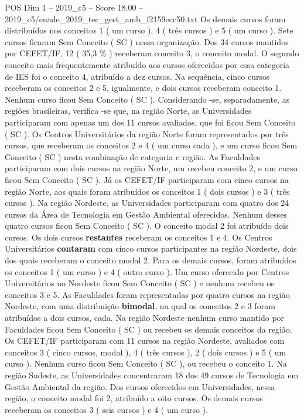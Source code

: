 \begin{textsample}{POS Dim 1 – 2019\_c5 – Score 18.00 – 2019\_c5/enade\_2019\_tec\_gest\_amb\_f2159ecc50.txt}
Os demais cursos foram distribuídos nos conceitos 1 ( um curso ), 4 ( três cursos ) e 5 ( um curso ).
Sete cursos ficaram Sem Conceito ( SC ) nessa organização.
Dos 34 cursos mantidos por CEFET/IF, 12 ( 35,3 \% ) receberam conceito 3, o conceito modal.
O segundo conceito mais frequentemente atribuído aos cursos oferecidos por essa categoria de IES foi o conceito 4, atribuído a dez cursos.
Na sequência, cinco cursos receberam os conceitos 2 e 5, igualmente, e dois cursos receberam conceito 1.
Nenhum curso ficou Sem Conceito ( SC ).
Considerando -se, separadamente, as regiões brasileiras, verifica -se que, na região Norte, as Universidades participaram com apenas um dos 11 cursos avaliados, que foi ficou Sem Conceito ( SC ).
Os Centros Universitários da região Norte foram representados por três cursos, que receberam os conceitos 2 e 4 ( um curso cada ), e um curso ficou Sem Conceito ( SC ) nesta combinação de categoria e região.
As Faculdades participaram com dois cursos na região Norte, um recebeu conceito 2, e um curso ficou Sem Conceito ( SC ).
Já os CEFET/IF participaram com cinco cursos na região Norte, aos quais foram atribuídos os conceitos 1 ( dois cursos ) e 3 ( três cursos ).
Na região Nordeste, as Universidades participaram com quatro dos 24 cursos da Área de Tecnologia em Gestão Ambiental oferecidos.
Nenhum desses quatro cursos ficou Sem Conceito ( SC ).
O conceito modal 2 foi atribuído dois cursos.
Os dois cursos \textbf{restantes} receberam os conceitos 1 e 4.
Os Centros Universitários \textbf{contaram} com cinco cursos participantes na região Nordeste, dois dos quais receberam o conceito modal 2.
Para os demais cursos, foram atribuídos os conceitos 1 ( um curso ) e 4 ( outro curso ).
Um curso oferecido por Centros Universitários no Nordeste ficou Sem Conceito ( SC ) e nenhum recebeu os conceitos 3 e 5.
As Faculdades foram representadas por quatro cursos na região Nordeste, com uma distribuição \textbf{bimodal}, na qual os conceitos 2 e 3 foram atribuídos a dois cursos, cada.
Na região Nordeste nenhum curso mantido por Faculdades ficou Sem Conceito ( SC ) ou recebeu os demais conceitos da região.
Os CEFET/IF participaram com 11 cursos na região Nordeste, avaliados com conceitos 3 ( cinco cursos, modal ), 4 ( três cursos ), 2 ( dois cursos ) e 5 ( um curso ).
Nenhum curso ficou Sem Conceito ( SC ), ou recebeu o conceito 1.
Na região Sudeste, as Universidades concentraram 18 dos 49 cursos de Tecnologia em Gestão Ambiental da região.
Dos cursos oferecidos em Universidades, nessa região, o conceito modal foi 2, atribuído a oito cursos.
Os demais cursos receberam os conceitos 3 ( seis cursos ) e 4 ( um curso ).

\end{textsample}
